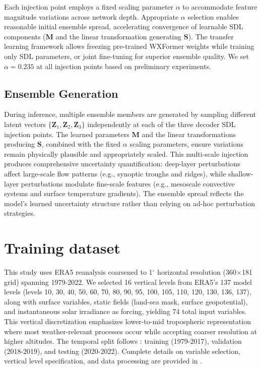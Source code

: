 \documentclass[11pt]{article}
\begin{document}
Each injection point employs a fixed scaling parameter $\alpha$ to accommodate feature magnitude variations across network depth. Appropriate $\alpha$ selection enables reasonable initial ensemble spread, accelerating convergence of learnable SDL components ($\mathbf{M}$ and the linear transformation generating $\mathbf{S}$). The transfer learning framework allows freezing pre-trained WXFormer weights while training only SDL parameters, or joint fine-tuning for superior ensemble quality. We set $\alpha = 0.235$ at all injection points based on preliminary experiments.

\subsection{Ensemble Generation}
During inference, multiple ensemble members are generated by sampling different latent vectors $\{\mathbf{Z}_1, \mathbf{Z}_2, \mathbf{Z}_3\}$ independently at each of the three decoder SDL injection points. The learned parameters $\mathbf{M}$ and the linear transformations producing $\mathbf{S}$, combined with the fixed $\alpha$ scaling parameters, ensure variations remain physically plausible and appropriately scaled. This multi-scale injection produces comprehensive uncertainty quantification: deep-layer perturbations affect large-scale flow patterns (e.g., synoptic troughs and ridges), while shallow-layer perturbations modulate fine-scale features (e.g., mesoscale convective systems and surface temperature gradients). The ensemble spread reflects the model's learned uncertainty structure rather than relying on ad-hoc perturbation strategies.

\section{Training dataset}
This study uses ERA5 reanalysis \cite{hersbach2020era5} coarsened to 1$^\circ$ horizontal resolution (360$\times$181 grid) spanning 1979-2022. We selected 16 vertical levels from ERA5's 137 model levels (levels 10, 30, 40, 50, 60, 70, 80, 90, 95, 100, 105, 110, 120, 130, 136, 137), along with surface variables, static fields (land-sea mask, surface geopotential), and instantaneous solar irradiance as forcing, yielding 74 total input variables. This vertical discretization emphasizes lower-to-mid tropospheric representation where most weather-relevant processes occur while accepting coarser resolution at higher altitudes. The temporal split follows \cite{schreck2025}: training (1979-2017), validation (2018-2019), and testing (2020-2022). Complete details on variable selection, vertical level specification, and data processing are provided in \cite{schreck2025, sha2025terrain}.
\end{document}
